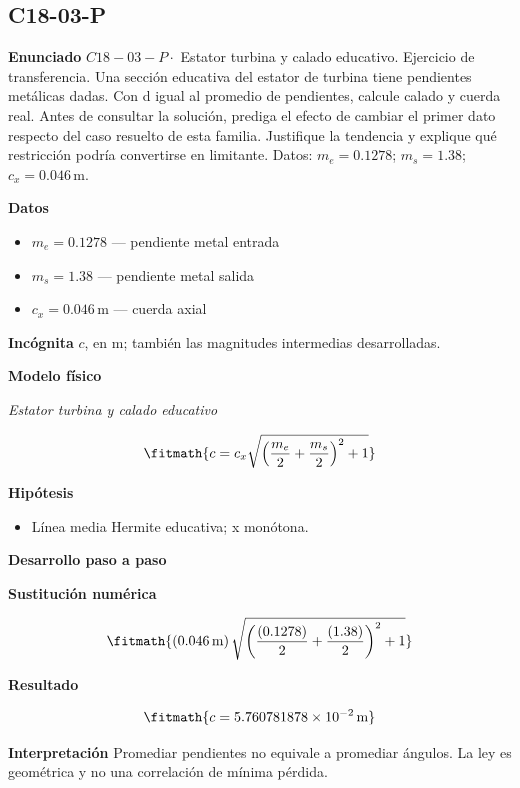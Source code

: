 \documentclass[10pt,openany]{book}
\begin{document}
\subsection*{C18-03-P}

\noindent\textbf{Enunciado}
\(C18-03-P \cdot\) Estator turbina y calado educativo. Ejercicio de transferencia. Una sección educativa del estator de turbina tiene pendientes metálicas dadas. Con d igual al promedio de pendientes, calcule calado y cuerda real. Antes de consultar la solución, prediga el efecto de cambiar el primer dato respecto del caso resuelto de esta familia. Justifique la tendencia y explique qué restricción podría convertirse en limitante. Datos: \(m_e=0.1278\); \(m_s=1.38\); \(c_x=0.046\, \mathrm{m}\).

\noindent\textbf{Datos}
\begin{itemize}
\item $m_e = 0.1278$ — pendiente metal entrada
\item $m_s = 1.38$ — pendiente metal salida
\item $c_x = 0.046\,\mathrm{m}$ — cuerda axial
\end{itemize}

\noindent\textbf{Incógnita}
$c$, en $\mathrm{m}$; también las magnitudes intermedias desarrolladas.

\noindent\textbf{Modelo físico}

\noindent\textit{Estator turbina y calado educativo}

\[
\fitmath{c=c_x \sqrt{\left(\frac{m_e}{2} + \frac{m_s}{2}\right)^{2} + 1}}
\]

\noindent\textbf{Hipótesis}
\begin{itemize}
\item Línea media Hermite educativa; x monótona.
\end{itemize}

\noindent\textbf{Desarrollo paso a paso}



\noindent\textbf{Sustitución numérica}

\[
\fitmath{\left(0.046\,\mathrm{m}\right) \sqrt{\left(\frac{\left(0.1278\right)}{2} + \frac{\left(1.38\right)}{2}\right)^{2} + 1}}
\]

\noindent\textbf{Resultado}

\[
\fitmath{c=5.760781878\times10^{-2}\,\mathrm{m}}
\]

\noindent\textbf{Interpretación}
Promediar pendientes no equivale a promediar ángulos. La ley es geométrica y no una correlación de mínima pérdida.
\end{document}
